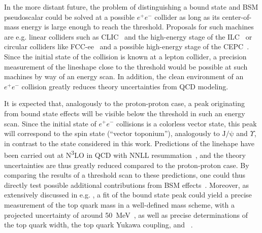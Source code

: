 In the more distant future, the problem of distinguishing a \ttbar bound state and BSM pseudoscalar could be solved at a possible $e^+ e^-$ collider as long as its center-of-mass energy is large enough to reach the \ttbar threshold. Proposals for such machines are e.g. linear colliders such as CLIC~\cite{Brunner:2022usy} and the high-energy stage of the ILC~\cite{Evans:2017rvt} or circular colliders like FCC-ee~\cite{FCC:2025lpp} and a possible high-energy stage of the CEPC~\cite{CEPCStudyGroup:2023quu}. Since the initial state of the collision is known at a lepton collider, a precision measurement of the \mtt lineshape close to the \ttbar threshold would be possible at such machines by way of an energy scan.
In addition, the clean environment of an $e^+ e^-$ collision greatly reduces theory uncertainties from QCD modeling. 

It is expected that, analogously to the proton-proton case, a peak originating from \ttbar bound state effects will be visible below the \ttbar threshold in such an energy scan. Since the initial state of $e^+ e^-$ collisions is a colorless vector state, this peak will correspond to the  spin state (``vector toponium''), analogously to $\mathrm{J/\psi}$ and $\Upsilon$, in contrast to the  state considered in this work. Predictions of the linehape have been carried out at N\textsuperscript{3}LO in QCD with NNLL resummation~\cite{Beneke:2015kwa,Hoang:2013uda}, and the theory uncertainties are thus greatly reduced compared to the proton-proton case. By comparing the results of a threshold scan to these predictions, one could thus directly test possible additional contributions from BSM effects~\cite{Djouadi:2024lyv}. Moreover, as extensively discussed in e.g. , a fit of the bound state peak could yield a precise measurement of the top quark mass in a well-defined mass scheme, with a projected uncertainty of around \SI{50}{\mega\electronvolt}~\cite{Bambade:2019fyw,FCC:2025lpp}, as well as precise determinations of the top quark width, the top quark Yukawa coupling, and \alphas~\cite{Horiguchi:2013wra,LinearColliderVision:2025hlt}.



